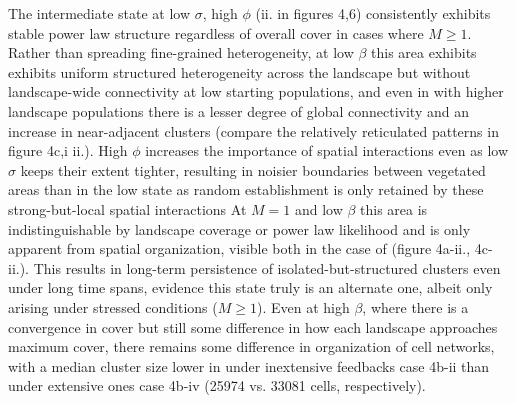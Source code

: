 \documentclass[10pt]{article}
\begin{document}
\begin{linenumbers}
The intermediate state at low $\sigma$, high $\phi$ (ii. in figures 4,6) consistently exhibits stable power law structure regardless of overall cover in cases where $M \ge 1$. Rather than spreading fine-grained heterogeneity, at low $\beta$ this area exhibits exhibits uniform structured heterogeneity across the landscape but without landscape-wide connectivity at low starting populations, and even in with higher landscape populations there is a lesser degree of global connectivity and an increase in near-adjacent clusters (compare the relatively reticulated patterns in figure 4c,i ii.).   High $\phi$ increases the importance of spatial interactions even as low $\sigma$ keeps their extent tighter, resulting in noisier boundaries between vegetated areas than in the low state as random establishment is only retained by these strong-but-local spatial interactions At $M = 1$  and low $\beta$ this area is indistinguishable by landscape coverage or power law likelihood and is only apparent from spatial organization, visible both in the case of  (figure 4a-ii., 4c-ii.).  This results in long-term persistence of isolated-but-structured clusters even under long time spans, evidence this state truly is an alternate one, albeit only arising under stressed conditions ($M \ge 1$). Even at high $\beta$, where there is a convergence in cover but still some difference in how each landscape approaches maximum cover, there remains some difference in organization of cell networks, with a median cluster size lower in under inextensive feedbacks case 4b-ii than under extensive ones case 4b-iv (25974 vs. 33081 cells, respectively).
%

\end{linenumbers}
\end{document}
